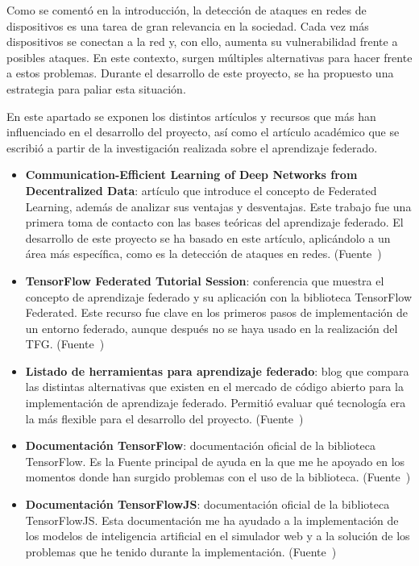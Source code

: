 
Como se comentó en la introducción, la detección de ataques en redes de dispositivos es una tarea de gran relevancia en la sociedad. Cada vez más dispositivos se conectan a la red y, con ello, aumenta su vulnerabilidad frente a posibles ataques. En este contexto, surgen múltiples alternativas para hacer frente a estos problemas. Durante el desarrollo de este proyecto, se ha propuesto una estrategia para paliar esta situación.

En este apartado se exponen los distintos artículos y recursos que más han influenciado en el desarrollo del proyecto, así como el artículo académico que se escribió a partir de la investigación realizada sobre el aprendizaje federado.

\begin{itemize}
    \item \textbf{Communication-Efficient Learning of Deep Networks from Decentralized Data}: artículo que introduce el concepto de Federated Learning, además de analizar sus ventajas y desventajas. Este trabajo fue una primera toma de contacto con las bases teóricas del aprendizaje federado. El desarrollo de este proyecto se ha basado en este artículo, aplicándolo a un área más específica, como es la detección de ataques en redes. (Fuente~\cite{aprendizaje_federado_articulo})
    \item \textbf{TensorFlow Federated Tutorial Session}: conferencia que muestra el concepto de aprendizaje federado y su aplicación con la biblioteca TensorFlow Federated. Este recurso fue clave en los primeros pasos de implementación de un entorno federado, aunque después no se haya usado en la realización del TFG. (Fuente~\cite{tensorflow_federated_tutorial})
    \item \textbf{Listado de herramientas para aprendizaje federado}: blog que compara las distintas alternativas que existen en el mercado de código abierto para la implementación de aprendizaje federado. Permitió evaluar qué tecnología era la más flexible para el desarrollo del proyecto. (Fuente~\cite{open_source_frameworks})
    \item \textbf{Documentación TensorFlow}: documentación oficial de la biblioteca TensorFlow. Es la Fuente principal de ayuda en la que me he apoyado en los momentos donde han surgido problemas con el uso de la biblioteca. (Fuente~\cite{tensorflow})
    \item \textbf{Documentación TensorFlowJS}: documentación oficial de la biblioteca TensorFlowJS. Esta documentación me ha ayudado a la implementación de los modelos de inteligencia artificial en el simulador web y a la solución de los problemas que he tenido durante la implementación. (Fuente~\cite{tensorflowjs})

\end{itemize}
